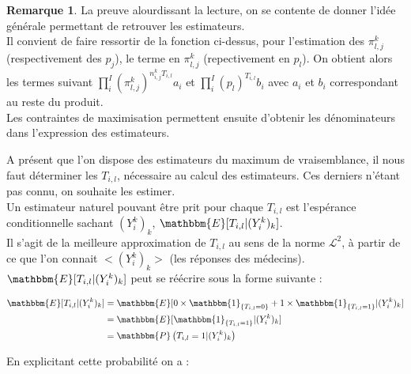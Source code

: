 \documentclass[frenchb]{report}
\newcommand{\1}{\mathbbm{1}}
\newcommand{\E}{\mathbbm{E}}
\newcommand{\prob}{\mathbbm{P}}
\theoremstyle{definition}\newtheorem{defn}{Définition}
\theoremstyle{definition}\newtheorem{exm}{Exemple}
\theoremstyle{definition}\newtheorem{nota}{Notation}
\theoremstyle{definition}\newtheorem{rem}{Remarque}
\begin{document}
\begin{rem}
	La preuve alourdissant la lecture, on se contente de donner l'idée générale permettant de retrouver les estimateurs. \\
Il convient de faire ressortir de la fonction ci-dessus, pour l'estimation des $\pi^k_{l,j}$ (respectivement des $p_j$), le terme en $\pi^k_{l,j}$ (repectivement en $p_l$). On obtient alors les termes suivant $\displaystyle \prod_i^I \left(\pi^k_{l,j}\right)^{n^k_{i,j}T_{i,l}} a_i$ et $\displaystyle \prod_i^I (p_l)^{T_{i,l}} b_i$ avec $a_i$ et $b_i$ correspondant au reste du produit.\\
Les contraintes de maximisation permettent ensuite d'obtenir les dénominateurs dans l'expression des estimateurs. 
\end{rem}
\bigskip
\bigskip
\bigskip

A présent que l'on dispose des estimateurs du maximum de vraisemblance, il nous faut déterminer les $T_{i,l}$, nécessaire au calcul des estimateurs. Ces derniers n'étant pas connu, on souhaite les estimer. \\
Un estimateur naturel pouvant être prit pour chaque $T_{i,l}$ est l'espérance conditionnelle sachant $(Y^k_i)_k$, $\E[T_{i,l}|(Y^k_i)_k]$. \\
Il s'agit de la meilleure approximation de $T_{i,l}$ au sens de la norme $\mathcal{L}^2$, à partir de ce que l'on connait $<(Y^k_i)_k>$ (les réponses des médecins).\\

$\E[T_{i,l}|(Y^k_i)_k]$ peut se réécrire sous la forme suivante : 

\begin{center}
	\begin{align*}
		\E[T_{i,l}|(Y^k_i)_k] &= \E[0 \times \1_{\{T_{i,l} = 0\}} + 1 \times \1_{\{T_{i,l} = 1\}}|(Y^k_i)_k] \\
		&= \E[\1_{\{T_{i,l} = 1\}}|(Y^k_i)_k]\\
		&= \prob\left( T_{i,l} = 1 |(Y^k_i)_k \right)\\
	\end{align*}
\end{center}

En explicitant cette probabilité on a : 
\end{document}
